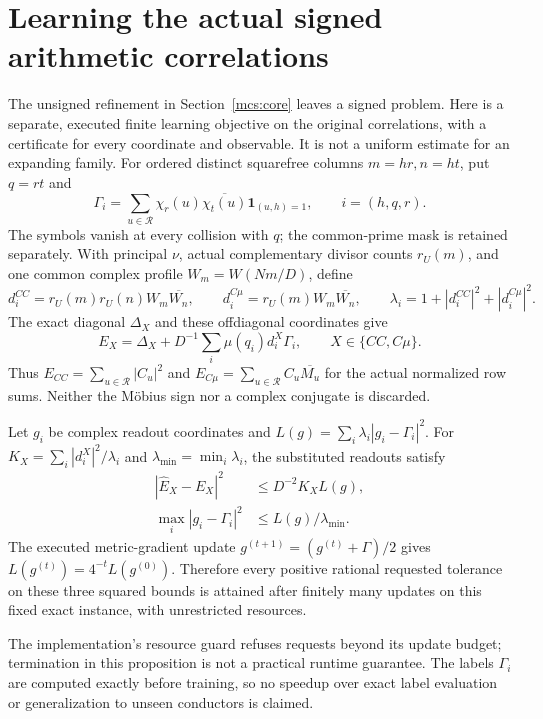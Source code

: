 \section{Learning the actual signed arithmetic correlations}\label{arl:core}
The unsigned refinement in Section~\ref{mcs:core} leaves a signed problem.
Here is a separate, executed finite learning objective on the original
correlations, with a certificate for every coordinate and observable.
It is not a uniform estimate for an expanding family.
For ordered distinct squarefree columns $m=hr,n=ht$, put $q=rt$ and
\[
 \Gamma_i=\sum_{u\in\mathcal R}\chi_r(u)\overline{\chi_t(u)}
                         \mathbf1_{(u,h)=1},\qquad i=(h,q,r).
\]
The symbols vanish at every collision with $q$; the common-prime mask is
retained separately. With principal $\nu$, actual complementary divisor counts
$r_U(m)$, and one common complex profile $W_m=W(Nm/D)$, define
\[
 d_i^{CC}=r_U(m)r_U(n)W_m\overline{W_n},\qquad
 d_i^{C\mu}=r_U(m)W_m\overline{W_n},\qquad
 \lambda_i=1+|d_i^{CC}|^2+|d_i^{C\mu}|^2.
\]
The exact diagonal $\Delta_X$ and these offdiagonal coordinates give
\begin{equation}\label{arl:observable}
 E_X=\Delta_X+D^{-1}\sum_i\mu(q_i)d_i^X\Gamma_i,
       \qquad X\in\{CC,C\mu\}.
\end{equation}
Thus $E_{CC}=\sum_{u\in\mathcal R}|C_u|^2$ and
$E_{C\mu}=\sum_{u\in\mathcal R}C_u\overline{M_u}$ for the actual normalized
row sums. Neither the M\"obius sign nor a complex conjugate is discarded.

\begin{proposition}\label{arl:certificate}
Let $g_i$ be complex readout coordinates and
$L(g)=\sum_i\lambda_i|g_i-\Gamma_i|^2$.
For $K_X=\sum_i|d_i^X|^2/\lambda_i$ and
$\lambda_{\min}=\min_i\lambda_i$, the substituted readouts satisfy
\begin{align*}
 |\widehat E_X-E_X|^2&\le D^{-2}K_X L(g),\\
 \max_i|g_i-\Gamma_i|^2&\le L(g)/\lambda_{\min}.
\end{align*}
The executed metric-gradient update $g^{(t+1)}=(g^{(t)}+\Gamma)/2$
gives $L(g^{(t)})=4^{-t}L(g^{(0)})$. Therefore every positive rational
requested tolerance on these three squared bounds is attained after finitely
many updates on this fixed exact instance, with unrestricted resources.
\end{proposition}
The implementation's resource guard refuses requests beyond its update budget;
termination in this proposition is not a practical runtime guarantee.
The labels $\Gamma_i$ are computed exactly before training, so no speedup over
exact label evaluation or generalization to unseen conductors is claimed.

